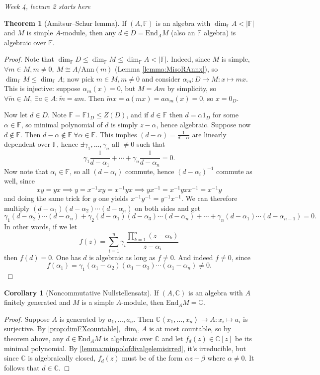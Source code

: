 \documentclass[a4paper]{article}
\newcommand{\la}{\left\langle}
\newcommand{\ra}{\right\rangle}
\newcommand{\F}{\mathbb{F}}
\newcommand{\C}{\mathbb{C}}
\newcommand{\Ann}{\text{Ann}}
\newcommand{\End}{\text{End}}
\theoremstyle{definition}
\newtheorem{thm}[defn]{Theorem}
\newtheorem{coro}[defn]{Corollary}
\begin{document}
\begin{flushright}
\textit{Week 4, lecture 2 starts here}
\end{flushright}

\begin{thm}[Amitsur–Schur lemma]
\label{thm:Amitsur-Schur}
If $(A,\F)$ is an algebra with $\dim_\F A < |\F|$ and $M$ is simple $A$-module, then any $d\in D=\End_A M$ (also an $\F$ algebra) is algebraic over $\F$.
\end{thm}
\begin{proof}
Note that $\dim_\F D\leq \dim_\F M\leq \dim_\F A <|\F|$. Indeed, since $M$ is simple, $\forall m\in M,m\neq 0,\ M\cong A/\Ann(m)$ (Lemma \ref{lemma:MisoRAnnx}), so $\dim_\F M\leq \dim_\F A$; now pick $m\in M,m\neq 0$ and consider $\alpha_m:D\rightarrow M:x\mapsto mx$. This is injective: suppose $\alpha_m(x)=0$, but $M=Am$ by simplicity, so $\forall \widetilde m\in M,\ \exists a\in A:\widetilde m=am$. Then $\widetilde m x=a(mx)=a\alpha_m(x)=0$, so $x=0_D$.

Now let $d\in D$. Note $\F=\F 1_D\leq Z(D)$, and if $d\in\F$ then $d=\alpha 1_D$ for some $\alpha\in\F$, so minimal polynomial of $d$ is simply $z-\alpha$, hence algebraic. Suppose now $d\notin\F$. Then $d-\alpha\notin\F \ \forall\alpha\in\F$. This implies $(d-\alpha)=\frac{1}{d-\alpha}$ are linearly dependent over $\F$, hence $\exists \gamma_1,\ldots,\gamma_n$ all $\neq 0$ such that
\[
\gamma_1 \frac{1}{d-\alpha_1}+\cdots+\gamma_n \frac{1}{d-\alpha_n}=0.
\]
Now note that $\alpha_i\in\F$, so all $(d-\alpha_i)$ commute, hence $(d-\alpha_i)^{-1}$ commute as well, since
\[
xy=yx\implies y=x^{-1}xy=x^{-1}yx\implies yx^{-1}=x^{-1}yxx^{-1}=x^{-1}y
\]
and doing the same trick for $y$ one yields $x^{-1}y^{-1}=y^{-1}x^{-1}$. We can therefore multiply $(d-\alpha_1)(d-\alpha_2)\cdots(d-\alpha_n)$ on both sides and get
\[
\gamma_1 (d-\alpha_2)\cdots(d-\alpha_n)+\gamma_2(d-\alpha_1)(d-\alpha_3)\cdots(d-\alpha_n)+\cdots+\gamma_n(d-\alpha_1)\cdots(d-\alpha_{n-1})=0.
\]
In other words, if we let
\[
f(z)=\sum_{i=1}^n \gamma_i \frac{\prod_{k=1}^n (z-\alpha_k)}{z-\alpha_i}
\]
then $f(d)=0$. One has $d$ is algebraic as long as $f\neq 0$. And indeed $f\neq 0$, since
\[
f(\alpha_1)=\gamma_1(\alpha_1-\alpha_2)(\alpha_1-\alpha_3)\cdots(\alpha_1-\alpha_n)\neq 0.
\]
\end{proof}

\begin{coro}[Noncommutative Nullstellensatz]
If $(A,\C)$ is an algebra with $A$ finitely generated and $M$ is a simple $A$-module, then $\End_AM=\C$.
\end{coro}
\begin{proof}
Suppose $A$ is generated by $a_1,\ldots,a_n$. Then $\C\la x_1,\ldots,x_n\ra\rightarrow A:x_i\mapsto a_i$ is surjective. By \ref{prop:dimFXcountable}, $\dim_\C A$ is at most countable, so by theorem above, any $d\in\End_AM$ is algebraic over $\C$ and let $f_d(z)\in \C[z]$ be its minimal polynomial. By \ref{lemma:minpolofdivalgelemisirred}, it's irreducible, but since $\C$ is algebraically closed, $f_d(z)$ must be of the form $\alpha z-\beta$ where $\alpha\neq 0$. It follows that $d\in\C$.
\end{proof}
\end{document}
